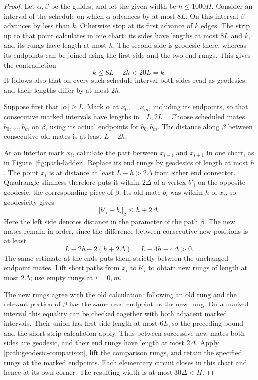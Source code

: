 \begin{proof}
Let $\alpha,\beta$ be the guides, and let the given width be
$h\le1000H$.  Consider an interval of the schedule on which $\alpha$
advances by at most $8L$.  On this interval $\beta$ advances by less than
$k$.  Otherwise stop at its first advance of $k$ edges.  The strip up to
that point calculates in one chart: its sides have lengths at most
$8L$ and $k$, and its rungs have length at most $h$.  The second side is
geodesic there, whereas its endpoints can be joined using the first side
and the two end rungs.  This gives the contradiction
\[
 k\le8L+2h<20L=k.
\]
It follows also that on every such schedule interval both sides read as
geodesics, and their lengths differ by at most $2h$.

Suppose first that $|\alpha|\ge L$.  Mark $\alpha$ at
$x_0,\ldots,x_m$, including its endpoints, so that consecutive marked
intervals have lengths in $[L,2L]$.  Choose scheduled mates
$b_0,\ldots,b_m$ on $\beta$, using its actual endpoints for $b_0,b_m$.
The distance along $\beta$ between consecutive old mates is at least
$L-2h$.



At an interior mark $x_i$, calculate the part between $x_{i-1}$ and
$x_{i+1}$ in one chart, as in Figure~\ref{fig:path-ladder}.
Replace its end rungs by geodesics of length at
most $h$.  The point $x_i$ is at distance at least $L-h>2\Delta$ from
either end connector.  Quadrangle slimness therefore puts it within
$2\Delta$ of a vertex $b'_i$ on the opposite geodesic, the corresponding
piece of $\beta$.  Its old mate $b_i$ was within $h$ of $x_i$, so
geodesicity gives
\begin{equation}\label{path:mate-shift}
 |b'_i-b_i|_{\beta}\le h+2\Delta.
\end{equation}
Here the left side denotes distance in the parameter of the path
$\beta$.  The new mates remain in order, since the difference between
consecutive new positions is at least
\[
 L-2h-2(h+2\Delta)=L-4h-4\Delta>0.
\]
The same estimate at the ends puts them strictly between the unchanged
endpoint mates.  Lift short paths from $x_i$ to $b'_i$ to obtain new
rungs of length at most $2\Delta$; use empty rungs at $i=0,m$.

The new rungs agree with the old calculation: following an old rung and
the relevant portion of $\beta$ has the same read endpoint as the new
rung.  On a marked interval this equality can be checked together with
both adjacent marked intervals.  Their union has first-side length at
most $6L$, so the preceding bound and the short-strip calculation apply.
Thus between successive new mates both sides are geodesic, and their
end rungs have length at most $2\Delta$.  Apply
\eqref{path:geodesic-comparison}, lift the comparison rungs, and retain
the specified rungs at the marked endpoints.  Each elementary circuit
closes in this chart and hence at its own corner.  The resulting width
is at most $30\Delta<H$.


\end{proof}
